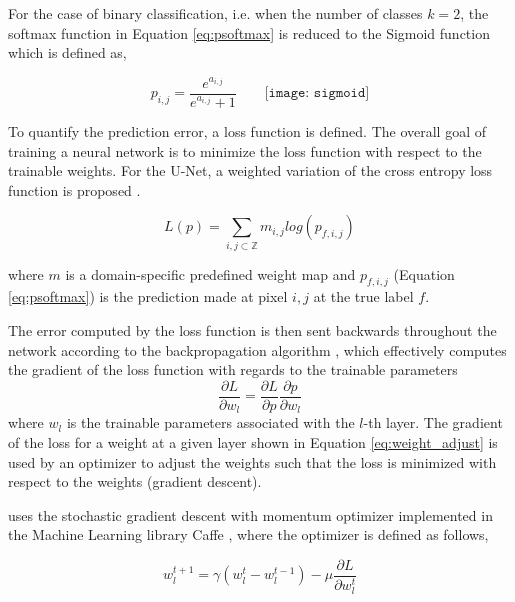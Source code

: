 \documentclass[../main/thesis.tex]{subfiles}
\begin{document}
For the case of binary classification, i.e. when the number of classes $k=2$, the softmax function in Equation \ref{eq:psoftmax} is reduced to the Sigmoid function which is defined as, 

\begin{equation}
    \label{eq:sigmoid}
    p_{i,j} = \frac{e^{a_{i,j}}}{e^{a_{i,j}} + 1} \qquad
    \texttt{[image: sigmoid]}
\end{equation}

To quantify the prediction error, a loss function is defined. The overall goal of training a neural network is to minimize the loss function with respect to the trainable weights. For the U-Net, a weighted variation of the cross entropy loss function is proposed \citep{Ronneberger2015}. 

\begin{equation}
    \label{eq:unet-loss}
    L(p) = \sum_{i,j \subset \mathbb{Z}}m_{i,j}log(p_{f,i,j})
\end{equation}

where $m$ is a domain-specific predefined weight map and $p_{f,i,j}$ (Equation \ref{eq:psoftmax}) is the prediction made at pixel $i,j$ at the true label $f$.

The error computed by the loss function is then sent backwards throughout the network according to the backpropagation algorithm \citep{Rumelhart1986}, which effectively computes the gradient of the loss function with regards to the trainable parameters 
\begin{equation}
    \label{eq:weight_adjust}
    \frac{\partial L}{\partial w_l} = \frac{\partial L}{\partial p}\frac{\partial p}{\partial w_l}
\end{equation}
where $w_l$ is the trainable parameters associated with the $l$-th layer. The gradient of the loss for a weight at a given layer shown in Equation \ref{eq:weight_adjust} is used by an optimizer to adjust the weights such that the loss is minimized with respect to the weights (gradient descent).

\citet{Ronneberger2015} uses the stochastic gradient descent with momentum optimizer implemented in the Machine Learning library Caffe \citep{Jia2014}, where the optimizer is defined as follows,

\begin{equation}
    \label{eq:msgd}
    w_l^{t+1} = \gamma(w_l^t - w_l^{t-1}) - \mu\frac{\partial L}{\partial w_l^t}
\end{equation}
\end{document}
